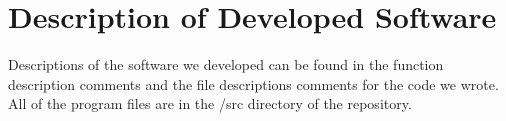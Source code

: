 \documentclass[11pt]{article}
\begin{document}




\appendix
\section{Description of Developed Software}

Descriptions of the software we developed can be found in the function
description comments and the file descriptions comments for the code we
wrote. All of the program files are in the /src directory of the
repository. 
\end{document}
